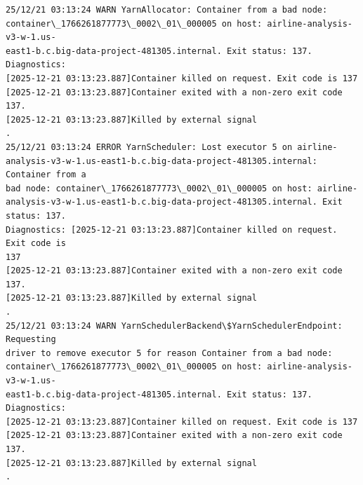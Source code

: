 \documentclass[11pt]{article}
\begin{document}
    \begin{Verbatim}[commandchars=\\\{\}]
25/12/21 03:13:24 WARN YarnAllocator: Container from a bad node:
container\_1766261877773\_0002\_01\_000005 on host: airline-analysis-v3-w-1.us-
east1-b.c.big-data-project-481305.internal. Exit status: 137. Diagnostics:
[2025-12-21 03:13:23.887]Container killed on request. Exit code is 137
[2025-12-21 03:13:23.887]Container exited with a non-zero exit code 137.
[2025-12-21 03:13:23.887]Killed by external signal
.
25/12/21 03:13:24 ERROR YarnScheduler: Lost executor 5 on airline-
analysis-v3-w-1.us-east1-b.c.big-data-project-481305.internal: Container from a
bad node: container\_1766261877773\_0002\_01\_000005 on host: airline-
analysis-v3-w-1.us-east1-b.c.big-data-project-481305.internal. Exit status: 137.
Diagnostics: [2025-12-21 03:13:23.887]Container killed on request. Exit code is
137
[2025-12-21 03:13:23.887]Container exited with a non-zero exit code 137.
[2025-12-21 03:13:23.887]Killed by external signal
.
25/12/21 03:13:24 WARN YarnSchedulerBackend\$YarnSchedulerEndpoint: Requesting
driver to remove executor 5 for reason Container from a bad node:
container\_1766261877773\_0002\_01\_000005 on host: airline-analysis-v3-w-1.us-
east1-b.c.big-data-project-481305.internal. Exit status: 137. Diagnostics:
[2025-12-21 03:13:23.887]Container killed on request. Exit code is 137
[2025-12-21 03:13:23.887]Container exited with a non-zero exit code 137.
[2025-12-21 03:13:23.887]Killed by external signal
.
    \end{Verbatim}
\end{document}
